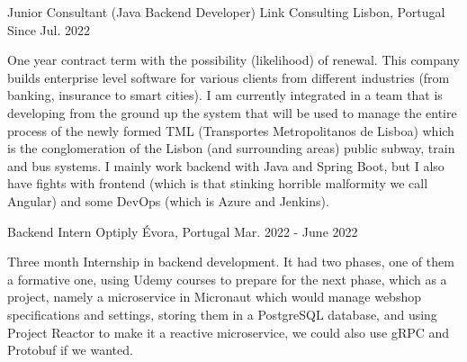 


\begin{cventries}


  \cventry
  {Junior Consultant (Java Backend Developer)} %
  {Link Consulting} %
  {Lisbon, Portugal} %
  {Since Jul. 2022} %
  { %
    \begin{cvitems}
      \item One year contract term with the possibility (likelihood) of renewal. This company builds enterprise level software for various clients from different industries (from banking, insurance to smart cities). I am currently integrated in a team that is developing from the ground up the system that will be used to manage the entire process of the newly formed TML (Transportes Metropolitanos de Lisboa) which is the conglomeration of the Lisbon (and surrounding areas) public subway, train and bus systems. I mainly work backend with Java and Spring Boot, but I also have fights with frontend (which is that stinking horrible malformity we call Angular) and some DevOps (which is Azure and Jenkins).
    \end{cvitems}
  }


  \cventry
  {Backend Intern} %
  {Optiply} %
  {Évora, Portugal} %
  {Mar. 2022 - June 2022} %
  { %
    \begin{cvitems}
      \item Three month Internship in backend development. It had two phases, one of them a formative one, using Udemy courses to prepare for the next phase, which as a project, namely a microservice in Micronaut which would manage webshop specifications and settings, storing them in a PostgreSQL database, and using Project Reactor to make it a reactive microservice, we could also use gRPC and Protobuf if we wanted.
    \end{cvitems}
  }


\end{cventries}
